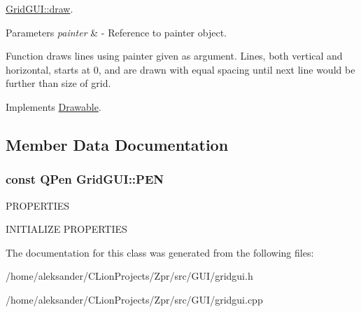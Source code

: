 \hyperlink{classGridGUI_a733eb9089f663b943a4df35bd0deb0e9}{Grid\-G\-U\-I\-::draw}. 


\begin{DoxyParams}{Parameters}
{\em painter} & -\/ Reference to painter object.\\
\hline
\end{DoxyParams}
Function draws lines using painter given as argument. Lines, both vertical and horizontal, starts at 0, and are drawn with equal spacing until next line would be further than size of grid. 

Implements \hyperlink{classDrawable}{Drawable}.



\subsection{Member Data Documentation}
\hypertarget{classGridGUI_a0bdab0ceaf6c0009b26b344bb20e75a4}{
\subsubsection[{P\-E\-N}]{\setlength{\rightskip}{0pt plus 5cm}const Q\-Pen Grid\-G\-U\-I\-::\-P\-E\-N\hspace{0.3cm}{\ttfamily [static]}}}\label{classGridGUI_a0bdab0ceaf6c0009b26b344bb20e75a4}
P\-R\-O\-P\-E\-R\-T\-I\-E\-S

I\-N\-I\-T\-I\-A\-L\-I\-Z\-E P\-R\-O\-P\-E\-R\-T\-I\-E\-S 

The documentation for this class was generated from the following files\-:\begin{DoxyCompactItemize}
\item 
/home/aleksander/\-C\-Lion\-Projects/\-Zpr/src/\-G\-U\-I/gridgui.\-h\item 
/home/aleksander/\-C\-Lion\-Projects/\-Zpr/src/\-G\-U\-I/gridgui.\-cpp\end{DoxyCompactItemize}
